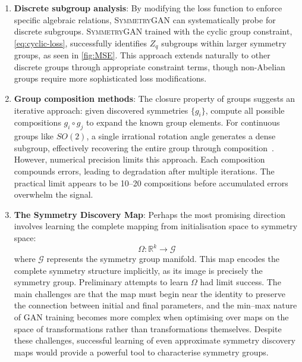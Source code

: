             \begin{enumerate}
                \item \textbf{Discrete subgroup analysis}: By modifying the loss function to enforce specific algebraic relations, \textsc{SymmetryGAN} can systematically probe for discrete subgroups.
                \textsc{SymmetryGAN} trained with the cyclic group constraint, \cref{eq:cyclic-loss}, successfully identifies \(Z_q\) subgroups within larger symmetry groups, as seen in \cref{fig:MSE}.
                This approach extends naturally to other discrete groups through appropriate constraint terms, though non-Abelian groups require more sophisticated loss modifications.
                \item \textbf{Group composition methods}: The closure property of groups suggests an iterative approach: given discovered symmetries \(\{g_i\}\), compute all possible compositions \(g_i \circ g_j\) to expand the known group elements.
                For continuous groups like \(SO(2)\), a single irrational rotation angle generates a dense subgroup, effectively recovering the entire group through composition~\cite{hall_matrix_2015}.
                However, numerical precision limits this approach.
                Each composition compounds errors, leading to degradation after multiple iterations.
                The practical limit appears to be \numrange{10}{20} compositions before accumulated errors overwhelm the signal.
                \item \textbf{The Symmetry Discovery Map}: Perhaps the most promising direction involves learning the complete mapping from initialisation space to symmetry space:
                \[
                    \Omega: \mathbb{R}^k \rightarrow \mathcal{G}
                \]
                where \(\mathcal{G}\) represents the symmetry group manifold.
                This map encodes the complete symmetry structure implicitly, as its image is precisely the symmetry group.
                Preliminary attempts to learn \(\Omega\) had limit success.
                The main challenges are that the map must begin near the identity to preserve the connection between initial and final parameters, and the min--max nature of GAN training becomes more complex when optimising over maps on the space of transformations rather than transformations themselves.
                Despite these challenges, successful learning of even approximate symmetry discovery maps would provide a powerful tool to characterise symmetry groups.
            \end{enumerate}


